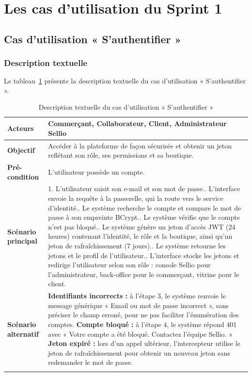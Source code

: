 \section{Les cas d'utilisation du Sprint 1}
\subsection{Cas d'utilisation « S'authentifier »}
\subsubsection{Description textuelle}
Le tableau~\ref{tab:uc-login} présente la description textuelle du cas d'utilisation « S'authentifier ».
\renewcommand{\arraystretch}{1.5}
\begin{longtable}{|p{4cm}|p{11cm}|}
\hline
\textbf{Acteurs} & Commerçant, Collaborateur, Client, Administrateur Sellio \\
\hline
\textbf{Objectif} & Accéder à la plateforme de façon sécurisée et obtenir un jeton reflétant son rôle, ses permissions et sa boutique. \\
\hline
\textbf{Pré-condition} & L'utilisateur possède un compte. \\
\hline
\textbf{Scénario principal} &
1. L'utilisateur saisit son e-mail et son mot de passe.\newline
2. L'interface envoie la requête à la passerelle, qui la route vers le service d'identité.\newline
3. Le système recherche le compte et compare le mot de passe à son empreinte BCrypt.\newline
4. Le système vérifie que le compte n'est pas bloqué.\newline
5. Le système génère un jeton d'accès JWT (24 heures) contenant l'identité, le rôle et la boutique, ainsi qu'un jeton de rafraîchissement (7 jours).\newline
6. Le système retourne les jetons et le profil de l'utilisateur.\newline
7. L'interface stocke les jetons et redirige l'utilisateur selon son rôle : console Sellio pour l'administrateur, back-office pour le commerçant, vitrine pour le client. \\
\hline
\textbf{Scénario alternatif} &
\textbf{Identifiants incorrects :} à l'étape 3, le système renvoie le message générique « Email ou mot de passe incorrect », sans préciser le champ erroné, pour ne pas faciliter l'énumération des comptes.\newline
\textbf{Compte bloqué :} à l'étape 4, le système répond 401 avec « Votre compte a été bloqué. Contactez l'équipe Sellio. »\newline
\textbf{Jeton expiré :} lors d'un appel ultérieur, l'intercepteur utilise le jeton de rafraîchissement pour obtenir un nouveau jeton sans redemander le mot de passe. \\
\hline
\caption{Description textuelle du cas d'utilisation « S'authentifier »}
\label{tab:uc-login}
\end{longtable}

